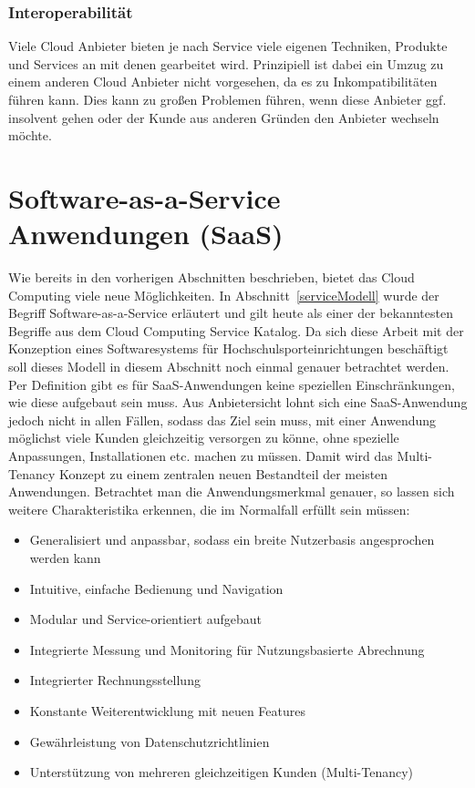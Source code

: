 \subsubsection{Interoperabilität}
Viele Cloud Anbieter bieten je nach Service viele eigenen Techniken, Produkte und Services an mit denen gearbeitet wird. Prinzipiell ist dabei ein Umzug zu einem anderen Cloud Anbieter nicht vorgesehen, da es zu Inkompatibilitäten führen kann. Dies kann zu großen Problemen führen, wenn diese Anbieter ggf. insolvent gehen oder der Kunde aus anderen Gründen den Anbieter wechseln möchte. 

\section{Software-as-a-Service Anwendungen (SaaS)}\label{SaaS}
Wie bereits in den vorherigen Abschnitten beschrieben, bietet das Cloud Computing viele neue Möglichkeiten. In Abschnitt~\ref{serviceModell} wurde der Begriff Software-as-a-Service erläutert und gilt heute als einer der bekanntesten Begriffe aus dem Cloud Computing Service Katalog. Da sich diese Arbeit mit der Konzeption eines Softwaresystems für Hochschulsporteinrichtungen beschäftigt soll dieses Modell in diesem Abschnitt noch einmal genauer betrachtet werden. 
\\
Per Definition gibt es für SaaS-Anwendungen keine speziellen Einschränkungen, wie diese aufgebaut sein muss. Aus Anbietersicht lohnt sich eine SaaS-Anwendung jedoch nicht in allen Fällen, sodass das Ziel sein muss, mit einer Anwendung möglichst viele Kunden gleichzeitig versorgen zu könne, ohne spezielle Anpassungen, Installationen etc. machen zu müssen. Damit wird das Multi-Tenancy Konzept zu einem zentralen neuen Bestandteil der meisten Anwendungen. Betrachtet man die Anwendungsmerkmal genauer, so lassen sich weitere Charakteristika erkennen, die im Normalfall erfüllt sein müssen:

\begin{itemize}
	\item Generalisiert und anpassbar, sodass ein breite Nutzerbasis angesprochen werden kann
	\item Intuitive, einfache Bedienung und Navigation
	\item Modular und Service-orientiert aufgebaut
	\item Integrierte Messung und Monitoring für Nutzungsbasierte Abrechnung
	\item Integrierter Rechnungsstellung
	\item Konstante Weiterentwicklung mit neuen Features
	\item Gewährleistung von Datenschutzrichtlinien
	\item Unterstützung von mehreren gleichzeitigen Kunden (Multi-Tenancy)
\end{itemize}


